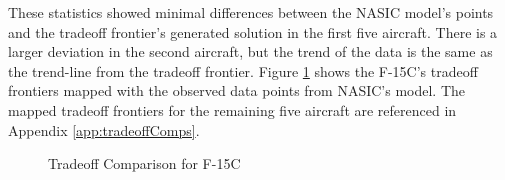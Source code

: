 These statistics showed minimal differences between the NASIC model's points and the tradeoff frontier's generated solution in the first five aircraft. There is a larger deviation in the second aircraft, but the trend of the data is the same as the trend-line from the tradeoff frontier. Figure \ref{fig:tradef15} shows the F-15C's tradeoff frontiers mapped with the observed data points from NASIC's model. The mapped tradeoff frontiers for the remaining five aircraft are referenced in Appendix \ref{app:tradeoffComps}.
\begin{figure}[H]
    \centering
    \qquad
    \qquad
    \caption{Tradeoff Comparison for F-15C}%
    \label{fig:tradef15}
\end{figure}


